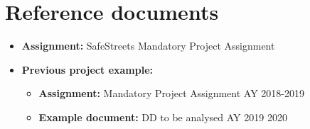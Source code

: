 \section{Reference documents}
\begin{itemize}
  \item \textbf{Assignment:} SafeStreets Mandatory Project Assignment
  \item \textbf{Previous project example:}
  \begin{itemize}
    \item \textbf{Assignment:} Mandatory Project Assignment AY 2018-2019
    \item \textbf{Example document:} DD to be analysed AY 2019 2020
  \end{itemize}
\end{itemize}